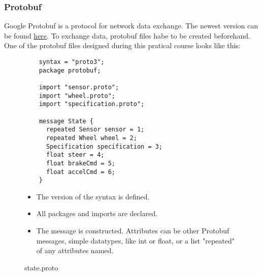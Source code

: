 \documentclass[paper=a4, fontsize=11pt]{scrartcl}
\begin{document}
  \subsubsection{Protobuf}
Google Protobuf is a protocol for network data exchange.
The newest version can be found \href{https://github.com/google/protobuf}{here}.
To exchange data, protobuf files habe to be created beforehand.
One of the protobuf files designed during this pratical course looks like this: 
  \begin{figure}[!h]
  \begin{minipage}{0.5\textwidth}
  \centering
    \begin{verbatim}
	syntax = "proto3";
	package protobuf;
	
	import "sensor.proto";
	import "wheel.proto";
	import "specification.proto";
	
	message State {
	  repeated Sensor sensor = 1;
	  repeated Wheel wheel = 2;
	  Specification specification = 3;
	  float steer = 4;
	  float brakeCmd = 5;
	  float accelCmd = 6;
	}
    \end{verbatim}
  \end{minipage}
  \begin{minipage}{0.5\textwidth}
    \begin{itemize}
\item The version of the syntax is defined.
\item All packages and imports are declared.
\item The message is constructed. Attributes can be other Protobuf messages, simple datatypes, like int or float, or a list "repeated" of any attributes named.
    \end{itemize}
  \end{minipage}
    \caption{\tiny state.proto}
  \end{figure}
\end{document}
